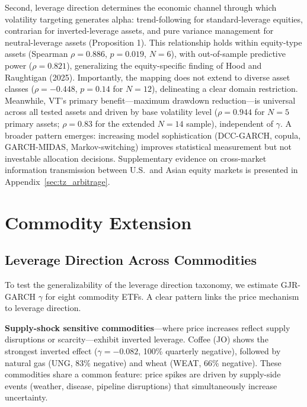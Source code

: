Second, leverage direction determines the economic channel through which volatility targeting generates alpha: trend-following for standard-leverage equities, contrarian for inverted-leverage assets, and pure variance management for neutral-leverage assets (Proposition 1). This relationship holds within equity-type assets (Spearman $\rho = 0.886$, $p = 0.019$, $N = 6$), with out-of-sample predictive power ($\rho = 0.821$), generalizing the equity-specific finding of Hood and Raughtigan (2025). Importantly, the mapping does not extend to diverse asset classes ($\rho = -0.448$, $p = 0.14$ for $N = 12$), delineating a clear domain restriction. Meanwhile, VT's primary benefit---maximum drawdown reduction---is universal across all tested assets and driven by base volatility level ($\rho = 0.944$ for $N = 5$ primary assets; $\rho = 0.83$ for the extended $N = 14$ sample), independent of $\gamma$. A broader pattern emerges: increasing model sophistication (DCC-GARCH, copula, GARCH-MIDAS, Markov-switching) improves statistical measurement but not investable allocation decisions. Supplementary evidence on cross-market information transmission between U.S.\ and Asian equity markets is presented in Appendix~\ref{sec:tz_arbitrage}.



\appendix

\section{Commodity Extension}

\subsection{Leverage Direction Across Commodities}

To test the generalizability of the leverage direction taxonomy, we estimate GJR-GARCH $\gamma$ for eight commodity ETFs. A clear pattern links the price mechanism to leverage direction.

\textbf{Supply-shock sensitive commodities}---where price increases reflect supply disruptions or scarcity---exhibit inverted leverage. Coffee (JO) shows the strongest inverted effect ($\gamma = -0.082$, 100\% quarterly negative), followed by natural gas (UNG, 83\% negative) and wheat (WEAT, 66\% negative). These commodities share a common feature: price spikes are driven by supply-side events (weather, disease, pipeline disruptions) that simultaneously increase uncertainty.

